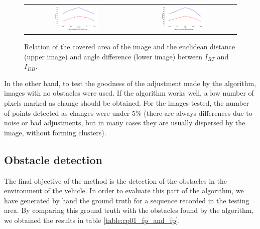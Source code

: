 \begin{figure}[h!]
\centering
\begin{tabular}{cc}
\includegraphics[width=0.45\textwidth]{distance_vs_area}\label{fig:cp01_distance_vs_area} &
\includegraphics[width=0.45\textwidth]{angle_vs_area}\label{fig:cp01_angle_vs_area}
\end{tabular}
\caption{Relation of the covered area of the image and the euclidean distance (upper image) and angle difference (lower image) between $I_{RT}$ and $I_{DB}$.}\label{fig:cp01_area_covered}
\end{figure}

In the other hand, to test the goodness of the adjustment made by the algorithm, images with no obstacles were used. If the algorithm works well, a low number of pixels marked as change should be obtained. For the images tested, the number of points detected as changes were under 5\% (there are always differences due to noise or bad adjustments, but in many cases they are usually dispersed by the image, without forming clusters).

\subsection{Obstacle detection}\label{ch:chapter01_02_02}

The final objective of the method is the detection of the obstacles in the environment of the vehicle. In order to evaluate this part of the algorithm, we have generated by hand the ground truth for a sequence recorded in the testing area. By comparing this ground truth with the obstacles found by the algorithm, we obtained the results in table \ref{table:cp01_fp_and_fp}.


